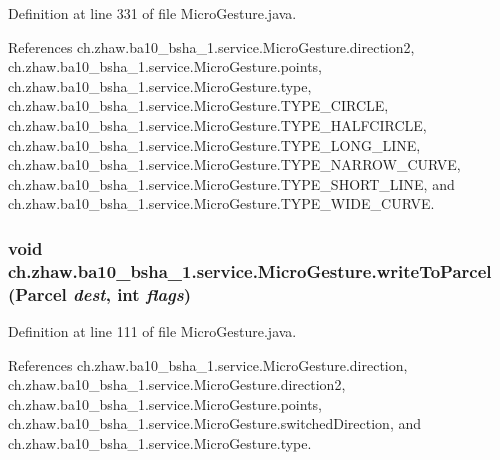 Definition at line 331 of file MicroGesture.java.

References ch.zhaw.ba10\_\-bsha\_\-1.service.MicroGesture.direction2, ch.zhaw.ba10\_\-bsha\_\-1.service.MicroGesture.points, ch.zhaw.ba10\_\-bsha\_\-1.service.MicroGesture.type, ch.zhaw.ba10\_\-bsha\_\-1.service.MicroGesture.TYPE\_\-CIRCLE, ch.zhaw.ba10\_\-bsha\_\-1.service.MicroGesture.TYPE\_\-HALFCIRCLE, ch.zhaw.ba10\_\-bsha\_\-1.service.MicroGesture.TYPE\_\-LONG\_\-LINE, ch.zhaw.ba10\_\-bsha\_\-1.service.MicroGesture.TYPE\_\-NARROW\_\-CURVE, ch.zhaw.ba10\_\-bsha\_\-1.service.MicroGesture.TYPE\_\-SHORT\_\-LINE, and ch.zhaw.ba10\_\-bsha\_\-1.service.MicroGesture.TYPE\_\-WIDE\_\-CURVE.\hypertarget{classch_1_1zhaw_1_1ba10__bsha__1_1_1service_1_1MicroGesture_ad934b5c1c2c627ea41d1a4d81d30e448}{
\subsubsection[{writeToParcel}]{\setlength{\rightskip}{0pt plus 5cm}void ch.zhaw.ba10\_\-bsha\_\-1.service.MicroGesture.writeToParcel (Parcel {\em dest}, \/  int {\em flags})}}
\label{classch_1_1zhaw_1_1ba10__bsha__1_1_1service_1_1MicroGesture_ad934b5c1c2c627ea41d1a4d81d30e448}


Definition at line 111 of file MicroGesture.java.

References ch.zhaw.ba10\_\-bsha\_\-1.service.MicroGesture.direction, ch.zhaw.ba10\_\-bsha\_\-1.service.MicroGesture.direction2, ch.zhaw.ba10\_\-bsha\_\-1.service.MicroGesture.points, ch.zhaw.ba10\_\-bsha\_\-1.service.MicroGesture.switchedDirection, and ch.zhaw.ba10\_\-bsha\_\-1.service.MicroGesture.type.

